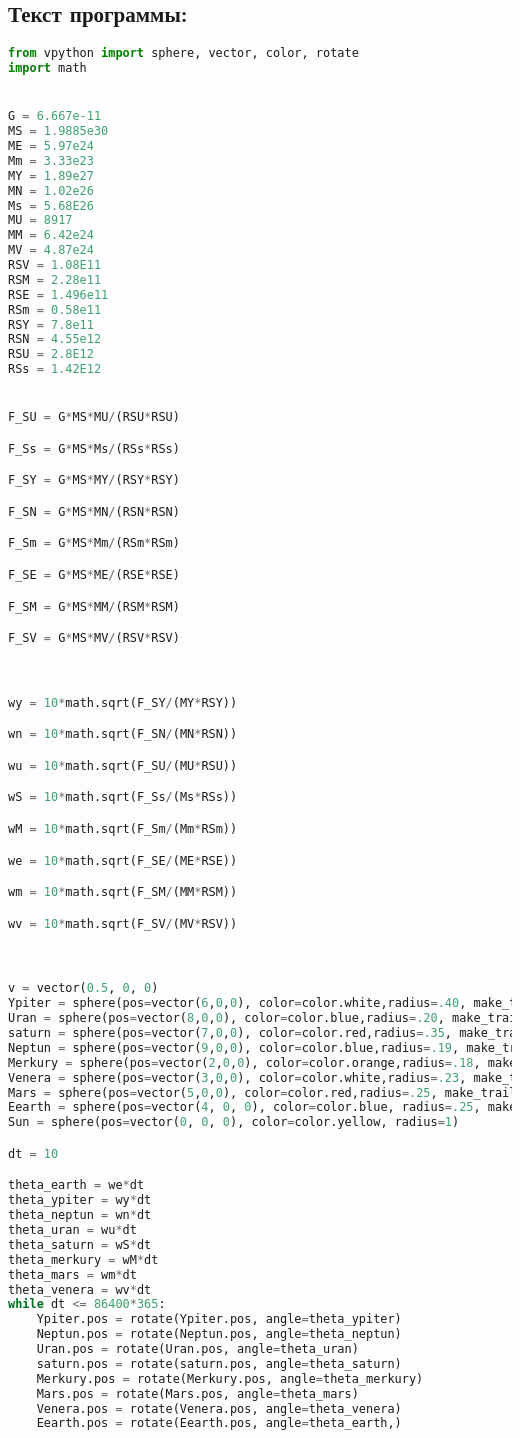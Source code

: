 \documentclass[12pt,a4paper]{extarticle}
\begin{document}
\subsection*{Текст программы:}
\begin{lstlisting}[language=python]
from vpython import sphere, vector, color, rotate
import math


G = 6.667e-11 
MS = 1.9885e30  
ME = 5.97e24  
Mm = 3.33e23 
MY = 1.89e27
MN = 1.02e26 
Ms = 5.68E26
MU = 8917 
MM = 6.42e24 
MV = 4.87e24
RSV = 1.08E11 
RSM = 2.28e11 
RSE = 1.496e11  
RSm = 0.58e11 
RSY = 7.8e11 
RSN = 4.55e12 
RSU = 2.8E12 
RSs = 1.42E12 


F_SU = G*MS*MU/(RSU*RSU)

F_Ss = G*MS*Ms/(RSs*RSs)

F_SY = G*MS*MY/(RSY*RSY)

F_SN = G*MS*MN/(RSN*RSN)

F_Sm = G*MS*Mm/(RSm*RSm)

F_SE = G*MS*ME/(RSE*RSE)

F_SM = G*MS*MM/(RSM*RSM)

F_SV = G*MS*MV/(RSV*RSV)



wy = 10*math.sqrt(F_SY/(MY*RSY))

wn = 10*math.sqrt(F_SN/(MN*RSN))

wu = 10*math.sqrt(F_SU/(MU*RSU))

wS = 10*math.sqrt(F_Ss/(Ms*RSs))

wM = 10*math.sqrt(F_Sm/(Mm*RSm))

we = 10*math.sqrt(F_SE/(ME*RSE))

wm = 10*math.sqrt(F_SM/(MM*RSM))

wv = 10*math.sqrt(F_SV/(MV*RSV))



v = vector(0.5, 0, 0)
Ypiter = sphere(pos=vector(6,0,0), color=color.white,radius=.40, make_trail=True)
Uran = sphere(pos=vector(8,0,0), color=color.blue,radius=.20, make_trail=True)
saturn = sphere(pos=vector(7,0,0), color=color.red,radius=.35, make_trail=True)
Neptun = sphere(pos=vector(9,0,0), color=color.blue,radius=.19, make_trail=True)
Merkury = sphere(pos=vector(2,0,0), color=color.orange,radius=.18, make_trail=True)
Venera = sphere(pos=vector(3,0,0), color=color.white,radius=.23, make_trail=True)
Mars = sphere(pos=vector(5,0,0), color=color.red,radius=.25, make_trail=True)
Eearth = sphere(pos=vector(4, 0, 0), color=color.blue, radius=.25, make_trail=True)
Sun = sphere(pos=vector(0, 0, 0), color=color.yellow, radius=1)

dt = 10

theta_earth = we*dt
theta_ypiter = wy*dt
theta_neptun = wn*dt
theta_uran = wu*dt
theta_saturn = wS*dt
theta_merkury = wM*dt
theta_mars = wm*dt
theta_venera = wv*dt
while dt <= 86400*365:
	Ypiter.pos = rotate(Ypiter.pos, angle=theta_ypiter)
	Neptun.pos = rotate(Neptun.pos, angle=theta_neptun)
	Uran.pos = rotate(Uran.pos, angle=theta_uran)
	saturn.pos = rotate(saturn.pos, angle=theta_saturn)
	Merkury.pos = rotate(Merkury.pos, angle=theta_merkury)
	Mars.pos = rotate(Mars.pos, angle=theta_mars)
	Venera.pos = rotate(Venera.pos, angle=theta_venera) 
	Eearth.pos = rotate(Eearth.pos, angle=theta_earth,)
\end{lstlisting}
\end{document}
